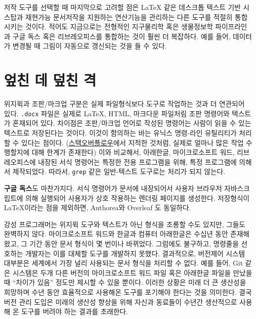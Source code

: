 \documentclass[
  letterpaper,
]{book}
\begin{document}
저작 도구를 선택할 때 마지막으로 고려할 점은 LaTeX 같은 데스크톱 텍스트
기반 시스탑과 재현가능 문서저작을 지원하는 연산기능을 관리하는 다른
도구를 적절히 통합시키는 것이다. 적어도 지금으로는 전형적인 지구물리학
혹은 생물정보학 파이프라인과 구글 독스 혹은 리브레오피스를 통합하는 것이
훨씬 더 복잡하다. 예를 들어, 데이터가 변경될 때 그림이 자동으로 갱신되는
것을 들 수 있다.

\hypertarget{uxc5ceuxce5c-uxb370-uxb36euxce5c-uxaca9}{%
\section{엎친 데 덮친
격}\label{uxc5ceuxce5c-uxb370-uxb36euxce5c-uxaca9}}

위지윅과 조판/마크업 구분은 실제 파일형식보다 도구로 작업하는 것과 더
연관되어 있다. \texttt{.docx} 파일은 실제로 LaTeX, HTML, 마크다운
파일처림 조판 명령어와 텍스트가 혼재되어 있다. 차이점은 조판/마크업
언어로 작성된 명령어는 사람이 읽을 수 있는 텍스트로 저장된다는 것이다.
이것이 함의하는 바는 유닉스 명령-라인 유틸리티가 처리할 수 있다는
점이다.
(\href{http://stackoverflow.com/a/1732454/1403470}{스택오버플로우}에서
지적한 것처럼, 실제로 얼마나 많은 작업 수행할지에 대해 한계가 존재한다)
이와 비교해서, 아래한글, 마이크로소프트 워드, 리브레오피스에 내장된 서식
명령어는 특정한 전용 프로그램을 위해, 특정 프로그램에 의해서 제작되었다.
따라서, \texttt{grep} 같은 일반-텍스트 도구로는 처리가 되지 않는다.

\textbf{구글 독스}도 마찬가지다. 서식 명령어가 문서에 내장되어서 사용자
브라우저 자바스크립트에 의해 실행되어 사용자가 상호 작용하는 렌더링
페이지를 생성한다. 저장형식이 LaTeX이라는 점을 제외하면, Authorea와
Overleaf 도 동일하다.

강성 프로그래머는 위지윅 도구와 텍스트가 아닌 형식을 조롱할 수도 있지만,
그들도 완벽하지 않다. 마이크로소프트 워드와 한글과 컴퓨터 아래한글은
수십년 동안 존재해왔고, 그 기간 동안 문서 형식이 몇 번이나 바뀌었다.
그럼에도 불구하고, 명령줄을 선호하는 개발자는 이를 대체할 도구를
개발하지 못했다. 결과적으로, 버전제어 시스템 대부분은 세계에서 가장 널리
사용되는 문서 형식을 처리할 수 없다. 예를 들어, Git 같은 시스템은 두개
다른 버전의 마이크로소프트 워드 파일 혹은 아래한글 파일을 만났을 때
``차이가 있음'' 정도만 제시할 수 있을 뿐이다. 이러한 상황은 미래 더 큰
생산성을 희망하며 수년 동안 효율적으로 사용해온 도구를 포기해야 한다는
것을 의미한다. 결국 버전 관리 도입은 미래의 생산성 향상을 위해 자신과
동료들이 수년간 생산적으로 사용해 온 도구를 버려야 하는 결과를 초래한다.
\end{document}
